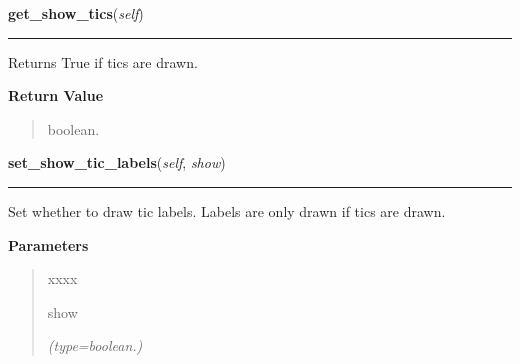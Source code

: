     \vspace{0.5ex}

\hspace{.8\funcindent}\begin{boxedminipage}{\funcwidth}

    \raggedright \textbf{get\_show\_tics}(\textit{self})

    \vspace{-1.5ex}

    \rule{\textwidth}{0.5\fboxrule}
\setlength{\parskip}{2ex}
    Returns True if tics are drawn.

\setlength{\parskip}{1ex}
      \textbf{Return Value}
    \vspace{-1ex}

      \begin{quote}
      boolean.

      \end{quote}

    \end{boxedminipage}

    \label{pygtk_chart:line_chart:Axis:set_show_tic_labels}

    \vspace{0.5ex}

\hspace{.8\funcindent}\begin{boxedminipage}{\funcwidth}

    \raggedright \textbf{set\_show\_tic\_labels}(\textit{self}, \textit{show})

    \vspace{-1.5ex}

    \rule{\textwidth}{0.5\fboxrule}
\setlength{\parskip}{2ex}
    Set whether to draw tic labels. Labels are only drawn if tics are 
    drawn.

\setlength{\parskip}{1ex}
      \textbf{Parameters}
      \vspace{-1ex}

      \begin{quote}
        \begin{Ventry}{xxxx}

          \item[show]

            {\it (type=boolean.)}

        \end{Ventry}

      \end{quote}

    \end{boxedminipage}

